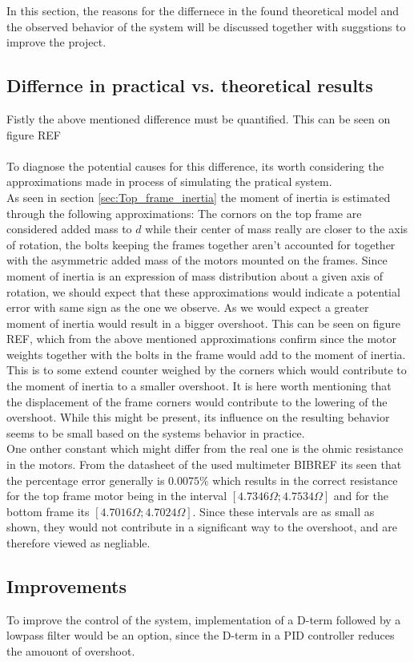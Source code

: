 \documentclass[../../main]{subfiles}
\begin{document}
In this section, the reasons for the differnece in the found theoretical model and the observed behavior of the system will be discussed together with suggstions to improve the project.
\subsection{Differnce in practical vs. theoretical results}
Fistly the above mentioned difference must be quantified. This can be seen on figure REF\\
\\
To diagnose the potential causes for this difference, its worth considering the approximations made in process of simulating the pratical system.\\
As seen in section \ref{sec:Top_frame_inertia} the moment of inertia is estimated through the following approximations: The cornors on the top frame are considered added mass to $d$ while their center of mass really are closer to the axis of rotation, the bolts keeping the frames together aren't accounted for together with the asymmetric added mass of the motors mounted on the frames. Since moment of inertia is an expression of mass distribution about a given axis of rotation, we should expect that these approximations would indicate a potential error with same sign as the one we observe. As we would expect a greater moment of inertia would result in a bigger overshoot. This can be seen on figure REF, which from the above mentioned approximations confirm since the motor weights together with the bolts in the frame would add to the moment of inertia. This is to some extend counter weighed by the corners which would contribute to the moment of inertia to a smaller overshoot. It is here worth mentioning that the displacement of the frame corners would contribute to the lowering of the overshoot. While this might be present, its influence on the resulting behavior seems to be small based on the systems behavior in practice.\\
One onther constant which might differ from the real one is the ohmic resistance in the motors. From the datasheet of the used multimeter BIBREF its seen that the percentage error generally is $0.0075\%$ which results in the correct resistance for the top frame motor being in the interval $[4.7346\Omega;4.7534\Omega]$ and for the bottom frame its $[4.7016\Omega;4.7024\Omega]$. Since these intervals are as small as shown, they would not contribute in a significant way to the overshoot, and are therefore viewed as negliable.\\
\subsection{Improvements}
To improve the control of the system, implementation of a D-term followed by a lowpass filter would be an option, since the D-term in a PID controller reduces the amouont of overshoot.
\end{document}
